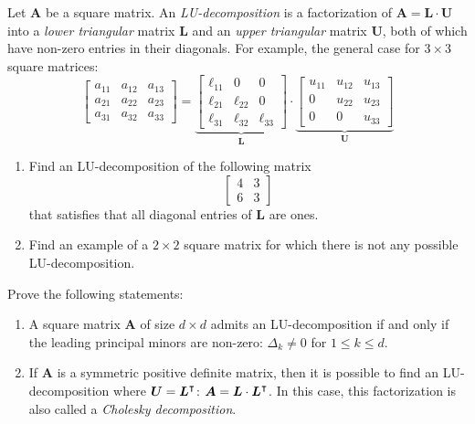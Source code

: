 \begin{problem}[Basic]
Let $\boldsymbol{A}$ be a square matrix.  An \emph{LU-decomposition} is a factorization of $\boldsymbol{A}=\boldsymbol{L} \cdot \boldsymbol{U}$ into a \emph{lower triangular} matrix $\boldsymbol{L}$ and an \emph{upper triangular} matrix $\boldsymbol{U}$, both of which have non-zero entries in their diagonals.  For example, the general case for $3 \times 3$ square matrices:
\begin{equation*}
\begin{bmatrix} 
a_{11} & a_{12} & a_{13} \\
a_{21} & a_{22} & a_{23} \\
a_{31} & a_{32} & a_{33}
\end{bmatrix} = \underbrace{\begin{bmatrix}
\ell_{11} & 0 & 0 \\
\ell_{21} & \ell_{22} & 0 \\
\ell_{31} & \ell_{32} & \ell_{33}
\end{bmatrix}}_{\boldsymbol{L}} \cdot \underbrace{\begin{bmatrix}
u_{11} & u_{12} & u_{13} \\
0 & u_{22} & u_{23} \\
0 & 0 & u_{33}
\end{bmatrix}}_{\boldsymbol{U}}
\end{equation*}
\begin{enumerate}
	\item Find an LU-decomposition of the following matrix
	\begin{equation*}
	\begin{bmatrix} 4 & 3 \\ 6 & 3 \end{bmatrix}
	\end{equation*}
	that satisfies that all diagonal entries of $\boldsymbol{L}$ are ones.
	\item Find an example of a $2\times 2$ square matrix for which there is not any possible LU-decomposition.
\end{enumerate}
\end{problem}

\begin{problem}[Advanced]
Prove the following statements:
\begin{enumerate}
	\item A square matrix $\boldsymbol{A}$ of size $d \times d$ admits an LU-decomposition if and only if the leading principal minors are non-zero: $\Delta_k \neq 0$ for $1 \leq k \leq d$.
	\item If $\boldsymbol{A}$ is a symmetric positive definite matrix, then it is possible to find an LU-decomposition where $\boldsymbol{U} = {\boldsymbol{L}}^\intercal$: $\boldsymbol{A} = \boldsymbol{L} \cdot {\boldsymbol{L}}^\intercal$.  In this case, this factorization is also called a \emph{Cholesky decomposition}.
\end{enumerate}
\end{problem}
